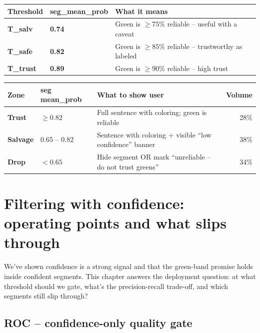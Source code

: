 \documentclass[11pt, a4paper]{article}
\begin{document}
\begin{table}[H]
\centering
\small
\begin{tabular}{lll}
\toprule
\textbf{Threshold} & \textbf{seg\_mean\_prob} & \textbf{What it means} \\
\midrule
\textbf{T\_salv}  & \textbf{0.74} & Green is $\ge 75\%$ reliable -- useful with a caveat \\
\textbf{T\_safe}  & \textbf{0.82} & Green is $\ge 85\%$ reliable -- trustworthy as labeled \\
\textbf{T\_trust} & \textbf{0.89} & Green is $\ge 90\%$ reliable -- high trust \\
\bottomrule
\end{tabular}
\end{table}

\begin{table}[H]
\centering
\small
\begin{tabular}{p{}p{}p{}r}
\toprule
\textbf{Zone} & \textbf{seg mean\_prob} & \textbf{What to show user} & \textbf{Volume} \\
\midrule
\textbf{Trust}    & $\ge 0.82$    & Full sentence with coloring; green is reliable & 28\% \\
\textbf{Salvage}  & 0.65 -- 0.82  & Sentence with coloring + visible ``low confidence'' banner & 38\% \\
\textbf{Drop}     & $< 0.65$      & Hide segment OR mark ``unreliable -- do not trust greens'' & 34\% \\
\bottomrule
\end{tabular}
\end{table}

\section{Filtering with confidence: operating points and what slips through}

We've shown confidence is a strong signal and that the green-band promise holds inside confident segments. This chapter answers the deployment question: at what threshold should we gate, what's the precision-recall trade-off, and which segments still slip through?

\subsection{ROC -- confidence-only quality gate}
\end{document}
